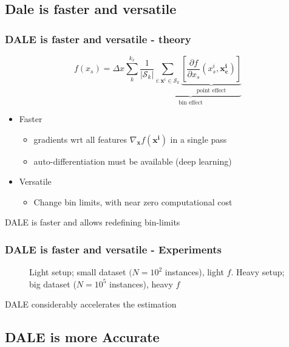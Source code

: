 \documentclass{beamer}
\newcommand{\xb}{\boldsymbol{x}}
\begin{document}
\subsection{Dale is faster and versatile}

\begin{frame}
  \frametitle{DALE is faster and versatile - theory}
    \[f(x_s) = \Delta x \sum_k^{k_x} \underbrace{\frac{1}{|\mathcal{S}_k|} \sum_{i:\xb^i \in \mathcal{S}_k} \underbrace{[\frac{\partial f}{\partial x_s}(x_s^i, \bm{x^i_c})]}_{\text{point effect}}}_{\text{bin effect}} \]

  \begin{itemize}
  \item Faster
    \begin{itemize}
      \item gradients wrt all features \(\nabla_{\bm{x}} f(\bm{x^i})\) in a single pass
      \item auto-differentiation must be available (deep learning)
    \end{itemize}
  \item Versatile
    \begin{itemize}
    \item Change bin limits, with near zero computational cost
    \end{itemize}

  \end{itemize}
  \noindent\makebox[\linewidth]{\rule{\paperwidth}{0.4pt}}
  DALE is faster and allows redefining bin-limits
\end{frame}

\begin{frame}
  \frametitle{DALE is faster and versatile - Experiments}
  \begin{figure}[h]
  \centering
  \resizebox{.4\columnwidth}{!}{}
  \resizebox{.43\columnwidth}{!}{}
  \caption[Case-1-fig-1]{Light setup; small dataset \((N=10^2\) instances), light \(f\). Heavy setup; big dataset (\(N=10^5\) instances), heavy \(f\)}
  \label{fig:case-1-plots-1}
\end{figure}

  \noindent\makebox[\linewidth]{\rule{\paperwidth}{0.4pt}}
  DALE considerably accelerates the estimation
\end{frame}


\subsection{DALE is more Accurate}
\end{document}
